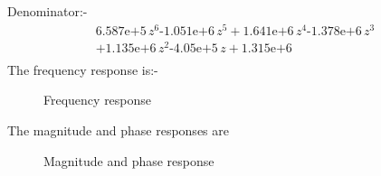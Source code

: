 \documentclass[12pt, letterpaper,]{article}
\begin{document}
Denominator:- 
\begin{align*}
\text{6.587e+5}\,z^6 \text{-1.051e+6}\,z^5 +\text{1.641e+6}\,z^4 \text{-1.378e+6}\,z^3\\ +\text{1.135e+6}\,z^2 \text{-4.05e+5}\,z +\text{1.315e+6}\\
\end{align*}
The frequency response is:-
\begin{figure}[!ht]
\centering
\vspace{-3mm}
\caption{Frequency response}
\end{figure}
\newpage
The magnitude and phase responses are
\begin{figure}[!ht]
\centering
\vspace{-3mm}
\caption{Magnitude and phase response}
\end{figure}\\
\end{document}
